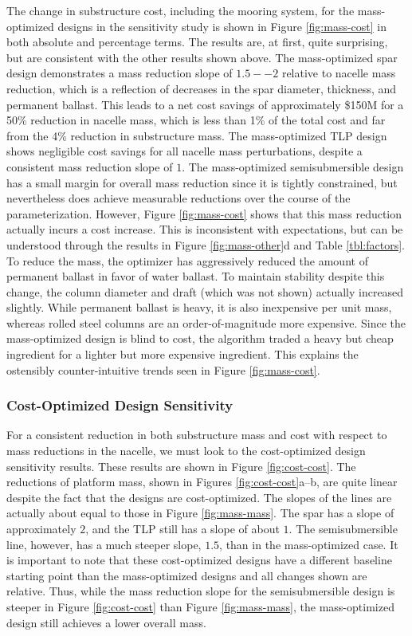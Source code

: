 The change in substructure cost, including the mooring system, for the
mass-optimized designs in the sensitivity study is shown in Figure
\ref{fig:mass-cost} in both absolute and percentage terms.  The results
are, at first, quite surprising, but are consistent with the other
results shown above.  The mass-optimized spar design demonstrates a
mass reduction slope of $1.5--2$ relative to nacelle mass reduction,
which is a reflection of decreases in the spar diameter, thickness, and
permanent ballast.  This leads to a net cost savings of approximately
\$150M for a 50\% reduction in nacelle mass, which is less than 1\% of
the total cost and far from the 4\% reduction in substructure mass.  The
mass-optimized TLP design shows negligible cost savings for all nacelle
mass perturbations, despite a consistent mass reduction slope of $1$.
The mass-optimized semisubmersible design has a small margin for overall
mass reduction since it is tightly constrained, but nevertheless does
achieve measurable reductions over the course of the parameterization.
However, Figure \ref{fig:mass-cost} shows that this mass reduction
actually incurs a cost increase.  This is inconsistent with
expectations, but can be understood through the results in Figure
\ref{fig:mass-other}d and Table \ref{tbl:factors}.  To reduce the mass,
the optimizer has aggressively reduced the amount of permanent ballast
in favor of water ballast.  To maintain stability despite this change,
the column diameter and draft (which was not shown) actually increased
slightly.  While permanent ballast is heavy, it is also inexpensive per
unit mass, whereas rolled steel columns are an order-of-magnitude more
expensive.  Since the mass-optimized design is blind to cost, the
algorithm traded a heavy but cheap ingredient for a lighter but more
expensive ingredient.  This explains the ostensibly counter-intuitive
trends seen in Figure \ref{fig:mass-cost}.

\subsubsection{Cost-Optimized Design Sensitivity}
For a consistent reduction in both substructure mass and cost with
respect to mass reductions in the nacelle, we must look to the
cost-optimized design sensitivity results.  These results are shown in
Figure \ref{fig:cost-cost}.  The reductions of platform mass, shown in
Figures \ref{fig:cost-cost}a--b, are quite linear despite the fact that
the designs are cost-optimized.  The slopes of the lines are actually
about equal to those in Figure \ref{fig:mass-mass}.  The spar has a
slope of approximately $2$, and the TLP still has a slope of about $1$.
The semisubmersible line, however, has a much steeper slope, $1.5$, than
in the mass-optimized case.  It is important to note that these
cost-optimized designs have a different baseline starting point than the
mass-optimized designs and all changes shown are relative.  Thus, while
the mass reduction slope for the semisubmersible design is steeper in
Figure \ref{fig:cost-cost} than Figure \ref{fig:mass-mass}, the
mass-optimized design still achieves a lower overall mass.

